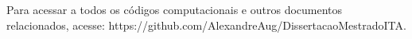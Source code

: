 \label{ap:apendiceD_codigos}

Para acessar a todos os códigos computacionais e outros documentos relacionados, acesse: https://github.com/AlexandreAug/DissertacaoMestradoITA.
